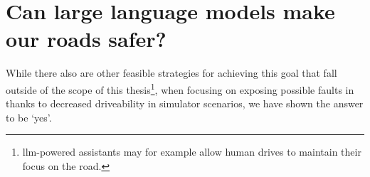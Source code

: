 \section{Can large language models make our roads safer?}

While there also are other feasible strategies
for achieving this goal that fall outside of the scope of this
thesis\footnote{\acrshort{llm}-powered assistants may for example allow human drives to maintain
    their focus on the road.}, when focusing on exposing possible faults in  thanks to
decreased driveability in simulator scenarios, we have shown the answer to be `yes'.